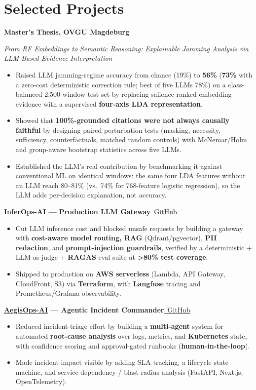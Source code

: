 \documentclass[10pt,a4paper]{article}
\newcommand{\gh}[1]{\href{https://github.com/sandipanseal/#1}{\faGithub\ GitHub}}
\newcommand{\entry}[2]{\vspace{3pt}\textbf{#1}\hfill #2\par}
\begin{document}
\section*{Selected Projects}
\entry{Master's Thesis, OVGU Magdeburg}{}\textit{From RF Embeddings to Semantic Reasoning: Explainable Jamming Analysis via LLM-Based Evidence Interpretation}
\begin{itemize}
\item Raised LLM jamming-regime accuracy from chance (19\%) to \textbf{56\%} (\textbf{73\%} with a zero-cost deterministic correction rule; best of five LLMs 78\%) on a class-balanced 2,500-window test set by replacing salience-ranked embedding evidence with a supervised \textbf{four-axis LDA representation}.
\item Showed that \textbf{100\%-grounded citations were not always causally faithful} by designing paired perturbation tests (masking, necessity, sufficiency, counterfactuals, matched random controls) with McNemar/Holm and group-aware bootstrap statistics across five LLMs.
\item Established the LLM's real contribution by benchmarking it against conventional ML on identical windows: the same four LDA features without an LLM reach 80--81\% (vs.\ 74\% for 768-feature logistic regression), so the LLM adds per-decision explanation, not accuracy.
\end{itemize}
\entry{\href{https://github.com/sandipanseal/InferOps-AI}{InferOps-AI} --- Production LLM Gateway}{\gh{InferOps-AI}}
\begin{itemize}
\item Cut LLM inference cost and blocked unsafe requests by building a gateway with \textbf{cost-aware model routing, RAG} (Qdrant/pgvector), \textbf{PII redaction}, and \textbf{prompt-injection guardrails}, verified by a deterministic + LLM-as-judge + \textbf{RAGAS} eval suite at \textbf{>80\% test coverage}.
\item Shipped to production on \textbf{AWS serverless} (Lambda, API Gateway, CloudFront, S3) via \textbf{Terraform}, with \textbf{Langfuse} tracing and Prometheus/Grafana observability.
\end{itemize}
\entry{\href{https://github.com/sandipanseal/AegisOps-AI}{AegisOps-AI} --- Agentic Incident Commander}{\gh{AegisOps-AI}}
\begin{itemize}
\item Reduced incident-triage effort by building a \textbf{multi-agent} system for automated \textbf{root-cause analysis} over logs, metrics, and \textbf{Kubernetes} state, with confidence scoring and approval-gated runbooks (\textbf{human-in-the-loop}).
\item Made incident impact visible by adding SLA tracking, a lifecycle state machine, and service-dependency / blast-radius analysis (FastAPI, Next.js, OpenTelemetry).
\end{itemize}
\end{document}
